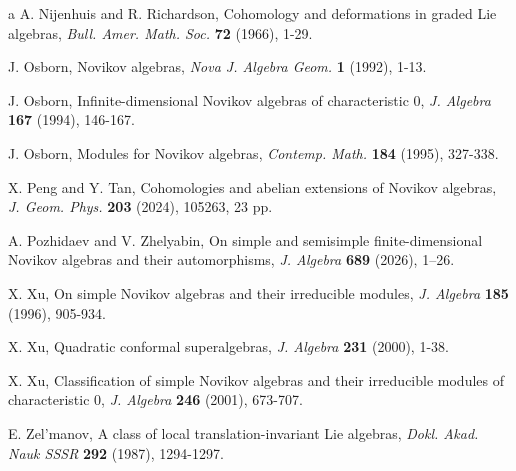 \documentclass[12pt]{amsart}
\theoremstyle{definition}
\begin{document}
\begin{thebibliography}{a}
 A. Nijenhuis  and R. Richardson,  Cohomology and deformations in graded Lie algebras, {\em Bull. Amer. Math. Soc.} {\bf 72} (1966), 1-29.

J. Osborn, Novikov algebras, {\em Nova J. Algebra Geom.} {\bf 1} (1992), 1-13.

J. Osborn, Infinite-dimensional Novikov algebras of characteristic $0$, {\em J. Algebra} {\bf 167} (1994), 146-167.

J. Osborn, Modules for Novikov algebras, {\em Contemp. Math.} {\bf 184} (1995), 327-338.

X. Peng and Y. Tan, Cohomologies and abelian extensions of Novikov algebras, {\em J. Geom. Phys.} {\bf 203} (2024), 105263, 23 pp.

A. Pozhidaev and V. Zhelyabin, On simple and semisimple finite-dimensional Novikov algebras and their automorphisms, {\em J. Algebra} {\bf 689} (2026), 1--26.


X. Xu, On simple Novikov algebras and their irreducible modules, {\em J. Algebra} {\bf 185} (1996), 905-934.


X. Xu, Quadratic conformal superalgebras, {\em J. Algebra} {\bf 231} (2000), 1-38.

X. Xu, Classification of simple Novikov algebras and their irreducible modules of characteristic 0, {\em J. Algebra} {\bf 246} (2001), 673-707.


E. Zel'manov, A class of local translation-invariant Lie algebras, {\em Dokl. Akad. Nauk SSSR} {\bf 292} (1987), 1294-1297. %


\end{thebibliography}
\end{document}
